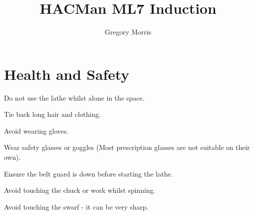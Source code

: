 \documentclass[11pt,a5paper,twoside,openany]{book}
\title{\textbf{HACMan ML7 Induction}}
\author{Gregory Morris}
\date{}
\newenvironment{checklist}{
  \begin{list}{}{}
  
}{%
  \end{list}
}
\begin{document}
\maketitle
\chapter{Health and Safety}
\begin{checklist}
\item Do not use the lathe whilst alone in the space.
\item Tie back long hair and clothing.
\item Avoid wearing gloves.
\item Wear safety glasses or goggles (Most prescription glasses are not suitable on their own).
\item Ensure the belt guard is down before starting the lathe.
\item Avoid touching the chuck or work whilst spinning.
\item Avoid touching the swarf - it can be very sharp.
\end{checklist}
\end{document}

